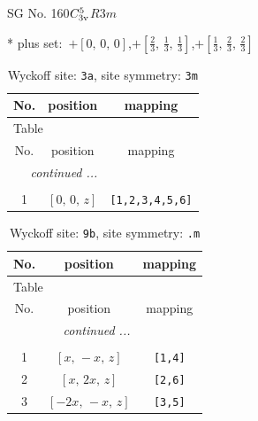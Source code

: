\documentclass[fleqn,8pt]{jsarticle}
\begin{document}
\setcounter{MaxMatrixCols}{32}

\renewcommand{\tablename}{Table~}
\renewcommand{\figurename}{Figure~}
\begin{center}
\LARGE
SG No. 160\quad$C_{\rm 3v}^{5}$\quad$R3m$\quad[ trigonal ]
\end{center}
* plus set:\,\,\,$+\left[ 0,\, 0,\, 0 \right]$,\quad $+\left[ \frac{2}{3},\, \frac{1}{3},\, \frac{1}{3} \right]$,\quad $+\left[ \frac{1}{3},\, \frac{2}{3},\, \frac{2}{3} \right]$
\renewcommand{\arraystretch}{1.2}
\begin{longtable}{ccc}
\caption{Wyckoff site: {\tt 3a}, site symmetry: {\tt 3m}}
 \\
 \hline \hline
No. & position & mapping \\ \hline \endfirsthead

\multicolumn{2}{l}{\tablename\ \thetable{}} \\
 \hline \hline
No. & position & mapping \\ \hline \endhead

 \hline \hline
\multicolumn{2}{r}{\footnotesize\it continued ...} \\ \endfoot

 \hline \hline
\multicolumn{2}{r}{} \\ \endlastfoot

1 & $\left[ 0,\, 0,\, z \right]$ & {\tt [1,2,3,4,5,6]} \\
\end{longtable}
\renewcommand{\arraystretch}{1.2}
\begin{longtable}{ccc}
\caption{Wyckoff site: {\tt 9b}, site symmetry: {\tt .m}}
 \\
 \hline \hline
No. & position & mapping \\ \hline \endfirsthead

\multicolumn{2}{l}{\tablename\ \thetable{}} \\
 \hline \hline
No. & position & mapping \\ \hline \endhead

 \hline \hline
\multicolumn{2}{r}{\footnotesize\it continued ...} \\ \endfoot

 \hline \hline
\multicolumn{2}{r}{} \\ \endlastfoot

1 & $\left[ x,\, - x,\, z \right]$ & {\tt [1,4]} \\ \hline
2 & $\left[ x,\, 2 x,\, z \right]$ & {\tt [2,6]} \\ \hline
3 & $\left[ - 2 x,\, - x,\, z \right]$ & {\tt [3,5]} \\
\end{longtable}
\end{document}
